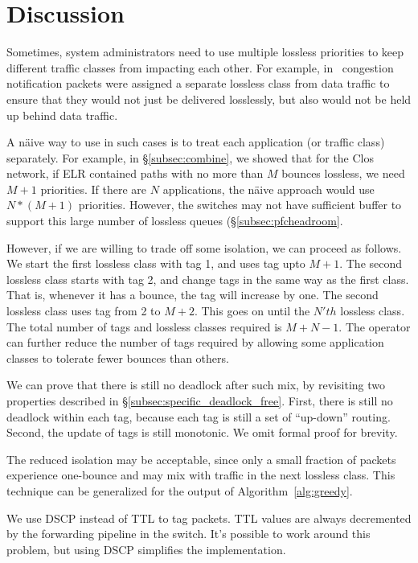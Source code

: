 \section{Discussion}

 Sometimes, system administrators need to
use multiple lossless priorities to keep different traffic classes from impacting each
other. For example, in~\cite{dcqcn} congestion notification packets were
assigned a separate lossless class from data traffic to ensure that they would
not just be delivered losslessly, but also would not be held up behind data
traffic.

A n{\"a}ive way to use \sysname{} in such cases is to treat each application (or
traffic class) separately.  For example, in \S\ref{subsec:combine}, we showed
that for the Clos network, if ELR contained paths with no more than $M$
bounces lossless, we need $M+1$ priorities. If there are $N$ applications, the
n{\"a}ive approach would use $N*(M+1)$ priorities.  However, the switches may
not have sufficient buffer to support this large number of lossless queues
(\S\ref{subsec:pfcheadroom}.

However, if we are willing to trade off some isolation, we can proceed as
follows.  We start the first lossless class with tag 1, and uses tag upto $M+1$.
The second lossless class starts with tag 2, and change tags in the same way as
the first class.  That is, whenever it has a bounce, the tag will increase by
one. The second lossless class uses tag from 2 to $M+2$. This goes on until the
$N'th$ lossless class. The total number of tags and lossless classes required is
$M + N -1$. The operator can further reduce the number of tags required by allowing
some application classes to tolerate fewer bounces than others.

We can prove that there is still no deadlock after such mix, by revisiting two
properties described in \S\ref{subsec:specific_deadlock_free}. First, there is
still no deadlock within each tag, because each tag is still a set of
``up-down'' routing. Second, the update of tags is still monotonic. We omit
formal proof for brevity.

The reduced isolation may be acceptable, since only a small fraction of
packets experience one-bounce and may mix with traffic in the next lossless
class.  This technique can be generalized for the output of
Algorithm~\ref{alg:greedy}.

 We use DSCP instead of TTL to tag packets. TTL
values are always decremented by the forwarding pipeline in the switch. It's
possible to work around this problem, but using DSCP simplifies the
implementation.

